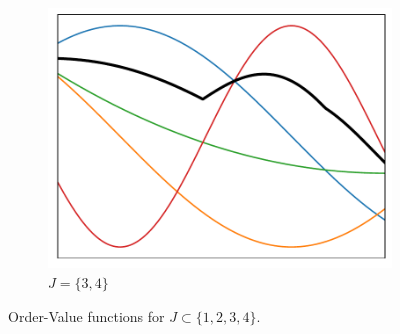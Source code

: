 \begin{figure}[H]
\begin{subfigure}{0.32\textwidth}
         \includegraphics[width=\textwidth]{pictures/cvar.pdf}
         \caption{$J=\{3,4\}$}
         \label{fig:cvar}
     \end{subfigure}
        \caption{Order-Value functions for $J\subset\{1,2,3,4\}$.}
        \label{fig:ovexamples}
\end{figure}

